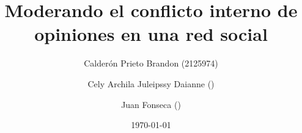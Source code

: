 \title{Moderando el conflicto interno de opiniones en una red social}
\author{
	Calderón Prieto Brandon (2125974) \and
	Cely Archila Juleipssy Daianne () \and
	Juan Fonseca () %
}
\date{\today}
